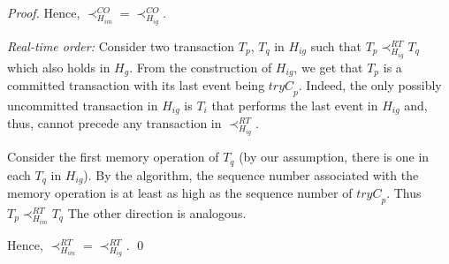 \documentclass{llncs}
\newcommand{\cmnt}[1]{}
\newcommand{\op} {operation}
\newcommand{\cseq} {\textit{commitSeqNum}}
\newcommand{\tryc} {\textit{tryC}}
\newcommand{\sgt} {SGT}
\newcommand{\memop} {memory operation}
\begin{document}
\begin{proof}
\noindent Hence, $\prec_{H_{im}}^{CO}=\prec_{H_{ig}}^{CO}$.

\noindent
\emph{Real-time order:} Consider two transaction $T_p$, $T_q$ in
$H_{ig}$ such that $T_p \prec_{H_{ig}}^{RT} T_q$ which also holds in
$H_g$.  From the construction of $H_{ig}$, we get that $T_p$ is a
committed transaction  with its last event being $\tryc_p$. Indeed,
the only possibly uncommitted transaction in $H_{ig}$ is $T_i$ that
performs the last event in $H_{ig}$ and, thus, cannot precede any
transaction in $\prec_{H_{ig}}^{RT}$. 

Consider the first \memop{} of $T_q$ (by our assumption, there is one
in each $T_q$ in $H_{ig}$). 
By the algorithm, the sequence number associated with the \memop{} is 
at least as high as the sequence number of $\tryc_p$.
Thus $T_p\prec_{H_{im}}^{RT} T_q$ 
The other direction is analogous.

\cmnt{
Let the first successful event of $T_q$ be $o_q$ which could be a read, write or \tryc. Considering each of the cases: (1) $o_q$ is a read \op{} $r_q$: In this case, we have that $\tryc_p <_{ig} r_i$. From the above case of write-read order, we get that this is also true in $H_{im}$. (2)$o_q$ is a $\tryc_q$ \op: In this case, we have that $\tryc_p <_{ig} \tryc_q$. If $\tryc_q$ returns abort, then as observed above $\tryc_q$ is the last \op{} in $H_{im}$. Otherwise, from write-write order shown above, we get that $\tryc_p <_{im} \tryc_q$. (3) $o_q$ is a write \op{} $w_q$: In this case, we have that $\tryc_p <_{ig} w_q$. This implies that $(\tryc_p <_{ig} \tryc_q) \Rightarrow (\tryc_p <_{im} \tryc_q)$ (from the above case).  In \sgt{} algorithm, the construction of $H_{im}$ is such that all the write \op{s} of a transaction are appended towards the end just before the \tryc{} \op. Thus, we have that $\tryc_p <_{im} w_q$. This proves all the cases. The other direction is analogous.
}
\cmnt {
\emph{Real-time order:}
Consider two transaction $T_p$, $T_q$ in $H_{ig}$ such that $T_p
\prec_{H_{ig}}^{RT} T_q$. 
From the construction of $H_{ig}$, we get that $T_p$ is a committed
transaction  with its last event being $\tryc_p$. 
Indeed, the only possibly uncommitted transaction in $H_{ig}$ is $T_i$
that performs the last event in $H_{ig}$ and, thus, cannot precede any
transaction in $\prec_{H_{ig}}^{RT}$.  
By the algorithm, any \memop{} of $T_q$ has a higher sequence number
than $T_q.\cseq$ and, thus, is ordered in $H_{im}$ after $T_p$.
The other direction is analogous.
}

Hence, $\prec_{H_{im}}^{RT}=\prec_{H_{ig}}^{RT}$. \qed
\end{proof}
\end{document}
